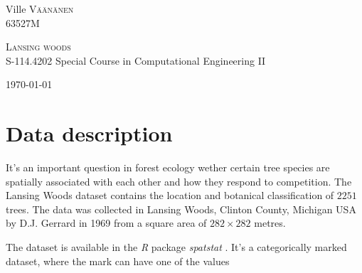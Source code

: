 \documentclass[12pt,a4paper,oneside,article]{memoir}
\author{Ville Väänänen}
\newcommand{\course}{S-114.4202}
\newcommand{\coursename}{Special Course in Computational Engineering II}
\newcommand{\studentid}{63527M}
\renewcommand{\title}{Lansing woods}
\begin{document}
\begin{titlingpage}
	\begin{center}
	\begin{minipage}{\textwidth}
	\begin{flushright} \large
	Ville \textsc{Väänänen}\\
	\studentid
	\end{flushright}
	\end{minipage}
	
	\vspace{8.0cm}
	\textsc{\LARGE \title}
	\HRule \\[0.19cm]
	{\large \course\: \coursename}
	
	
	\vfill
	\today
	\end{center}
\end{titlingpage}
\clearpage

\section{Data description}
It's an important question in forest ecology wether
certain tree species are spatially associated with each other
and how they respond to competition.
The Lansing Woods dataset \cite{lansing} contains the location and 
botanical classification of $2251$ trees. The data
was collected in Lansing Woods, Clinton County, Michigan USA by D.J.
Gerrard in 1969 from a square area of $282\times282$ metres.

The dataset is available in the \emph{R} package \emph{spatstat} \cite{R,spatstat}.
It's a categorically marked dataset, where the mark can have one of the values
\end{document}
